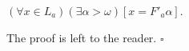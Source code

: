 $(\forall x \in L_a)(\exists \alpha > \omega)[x = F'_a \alpha].$

The proof is left to the reader. $\square$
